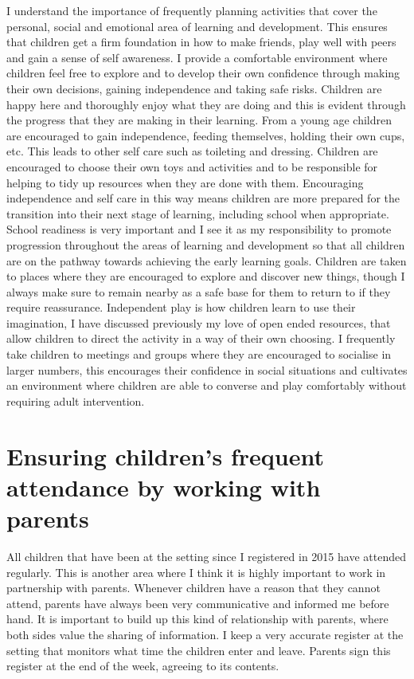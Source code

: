 \documentclass[10pt,a4paper]{report}
\begin{document}
I understand the importance of frequently planning activities that cover the personal, social and emotional area of learning and development. This ensures that children get a firm foundation in how to make friends, play well with peers and gain a sense of self awareness. I provide a comfortable environment where children feel free to explore and to develop their own confidence through making their own decisions, gaining independence and taking safe risks. Children are happy here and thoroughly enjoy what they are doing and this is evident through the progress that they are making in their learning. From a young age children are encouraged to gain independence, feeding themselves, holding their own cups, etc.  This leads to other self care such as toileting and dressing. Children are encouraged to choose their own toys and activities and to be responsible for helping to tidy up resources when they are done with them. Encouraging independence and self care in this way means children are more prepared for the transition into their next stage of learning, including school when appropriate. School readiness is very important and I see it as my responsibility to promote progression throughout the areas of learning and development so that all children are on the pathway towards achieving the early learning goals. Children are taken to places where they are encouraged to explore and discover new things, though I always make sure to remain nearby as a safe base for them to return to if they require reassurance. Independent play is how children learn to use their imagination, I have discussed previously my love of open ended resources, that allow children to direct the activity in a way of their own choosing. I frequently take children to meetings and groups where they are encouraged to socialise in larger numbers, this encourages their confidence in social situations and cultivates an environment where children are able to converse and play comfortably without requiring adult intervention.

\section{Ensuring children's frequent attendance by working with parents}

All children that have been at the setting since I registered in 2015 have attended regularly. This is another area where I think it is highly important to work in partnership with parents. Whenever children have a reason that they cannot attend, parents have always been very communicative and informed me before hand. It is important to build up this kind of relationship with parents, where both sides value the sharing of information. I keep a very accurate register at the setting that monitors what time the children enter and leave. Parents sign this register at the end of the week, agreeing to its contents.
\end{document}
